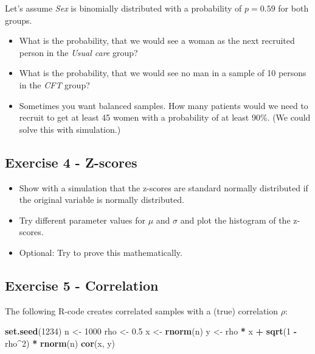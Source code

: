 \documentclass[
]{book}
\newenvironment{Shaded}{\begin{snugshade}}{\end{snugshade}}
\newcommand{\DecValTok}[1]{\textcolor[rgb]{0.00,0.00,0.81}{#1}}
\newcommand{\FloatTok}[1]{\textcolor[rgb]{0.00,0.00,0.81}{#1}}
\newcommand{\FunctionTok}[1]{\textcolor[rgb]{0.13,0.29,0.53}{\textbf{#1}}}
\newcommand{\NormalTok}[1]{#1}
\newcommand{\OtherTok}[1]{\textcolor[rgb]{0.56,0.35,0.01}{#1}}
\newcommand{\SpecialCharTok}[1]{\textcolor[rgb]{0.81,0.36,0.00}{\textbf{#1}}}
\providecommand{\tightlist}{%
  \setlength{\itemsep}{0pt}\setlength{\parskip}{0pt}}
\begin{document}
Let's assume \emph{Sex} is binomially distributed with a probability of \(p = 0.59\) for both groups.

\begin{itemize}
\tightlist
\item
  What is the probability, that we would see a woman as the next recruited person in the \emph{Usual care} group?
\item
  What is the probability, that we would see no man in a sample of 10 persons in the \emph{CFT} group?
\item
  Sometimes you want balanced samples. How many patients would we need to recruit to get at least 45 women with a probability of at least 90\%.
  (We could solve this with simulation.)
\end{itemize}

\subsection{Exercise 4 - Z-scores}\label{exercise4_descriptive_stats}

\begin{itemize}
\tightlist
\item
  Show with a simulation that the z-scores are standard normally distributed if the original variable is normally distributed.
\item
  Try different parameter values for \(\mu\) and \(\sigma\) and plot the histogram of the z-scores.
\item
  Optional: Try to prove this mathematically.
\end{itemize}

\subsection{Exercise 5 - Correlation}\label{exercise5_descriptive_stats}

The following R-code creates correlated samples with a (true) correlation \(\rho\):

\begin{Shaded}
\begin{Highlighting}[]
\FunctionTok{set.seed}\NormalTok{(}\DecValTok{1234}\NormalTok{)}
\NormalTok{n }\OtherTok{\textless{}{-}} \DecValTok{1000}
\NormalTok{rho }\OtherTok{\textless{}{-}} \FloatTok{0.5}
\NormalTok{x }\OtherTok{\textless{}{-}} \FunctionTok{rnorm}\NormalTok{(n)}
\NormalTok{y }\OtherTok{\textless{}{-}}\NormalTok{ rho }\SpecialCharTok{*}\NormalTok{ x }\SpecialCharTok{+} \FunctionTok{sqrt}\NormalTok{(}\DecValTok{1} \SpecialCharTok{{-}}\NormalTok{ rho}\SpecialCharTok{\^{}}\DecValTok{2}\NormalTok{) }\SpecialCharTok{*} \FunctionTok{rnorm}\NormalTok{(n)}
\FunctionTok{cor}\NormalTok{(x, y)}
\end{Highlighting}
\end{Shaded}
\end{document}
